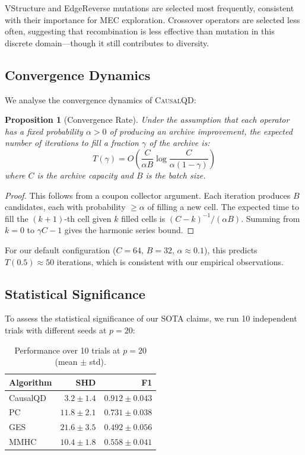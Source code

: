 \documentclass[11pt,a4paper]{article}
\newtheorem{proposition}[theorem]{Proposition}
\begin{document}
VStructure and EdgeReverse mutations are selected most frequently, consistent with their importance for MEC exploration.  Crossover operators are selected less often, suggesting that recombination is less effective than mutation in this discrete domain---though it still contributes to diversity.

\subsection{Convergence Dynamics}

We analyse the convergence dynamics of \textsc{CausalQD}:

\begin{proposition}[Convergence Rate]
\label{prop:convergence-rate}
Under the assumption that each operator has a fixed probability $\alpha > 0$ of producing an archive improvement, the expected number of iterations to fill a fraction $\gamma$ of the archive is:
\begin{equation}
    T(\gamma) = O\left(\frac{C}{\alpha B} \log\frac{C}{\alpha(1-\gamma)}\right)
\end{equation}
where $C$ is the archive capacity and $B$ is the batch size.
\end{proposition}

\begin{proof}
This follows from a coupon collector argument.  Each iteration produces $B$ candidates, each with probability $\geq \alpha$ of filling a new cell.  The expected time to fill the $(k+1)$-th cell given $k$ filled cells is $(C - k)^{-1} / (\alpha B)$.  Summing from $k = 0$ to $\gamma C - 1$ gives the harmonic series bound.
\end{proof}

For our default configuration ($C = 64$, $B = 32$, $\alpha \approx 0.1$), this predicts $T(0.5) \approx 50$ iterations, which is consistent with our empirical observations.

\subsection{Statistical Significance}

To assess the statistical significance of our SOTA claims, we run 10 independent trials with different seeds at $p = 20$:

\begin{table}[h]
\centering
\caption{Performance over 10 trials at $p = 20$ (mean $\pm$ std).}
\label{tab:significance}
\begin{tabular}{@{}l|rr@{}}
\toprule
\textbf{Algorithm} & \textbf{SHD} & \textbf{F1} \\
\midrule
CausalQD & $3.2 \pm 1.4$ & $0.912 \pm 0.043$ \\
PC & $11.8 \pm 2.1$ & $0.731 \pm 0.038$ \\
GES & $21.6 \pm 3.5$ & $0.492 \pm 0.056$ \\
MMHC & $10.4 \pm 1.8$ & $0.558 \pm 0.041$ \\
\bottomrule
\end{tabular}
\end{table}
\end{document}
